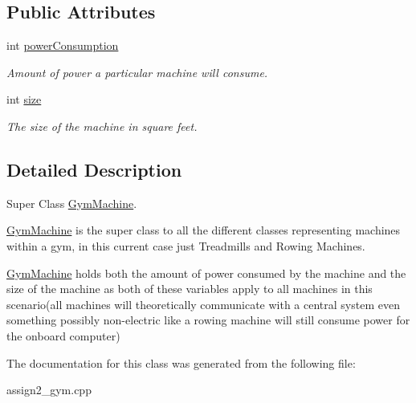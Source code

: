 \subsection*{Public Attributes}
\begin{DoxyCompactItemize}
\item 
\hypertarget{class_gym_machine_a680693dad7672fe9917de8951f59d182}{}int \hyperlink{class_gym_machine_a680693dad7672fe9917de8951f59d182}{power\+Consumption}\label{class_gym_machine_a680693dad7672fe9917de8951f59d182}

\begin{DoxyCompactList}\small\item\em Amount of power a particular machine will consume. \end{DoxyCompactList}\item 
\hypertarget{class_gym_machine_aa9dca285aa8e1fc53eb252cb691d3a69}{}int \hyperlink{class_gym_machine_aa9dca285aa8e1fc53eb252cb691d3a69}{size}\label{class_gym_machine_aa9dca285aa8e1fc53eb252cb691d3a69}

\begin{DoxyCompactList}\small\item\em The size of the machine in square feet. \end{DoxyCompactList}\end{DoxyCompactItemize}


\subsection{Detailed Description}
Super Class \hyperlink{class_gym_machine}{Gym\+Machine}. 

\hyperlink{class_gym_machine}{Gym\+Machine} is the super class to all the different classes representing machines within a gym, in this current case just Treadmills and Rowing Machines.

\hyperlink{class_gym_machine}{Gym\+Machine} holds both the amount of power consumed by the machine and the size of the machine as both of these variables apply to all machines in this scenario(all machines will theoretically communicate with a central system even something possibly non-\/electric like a rowing machine will still consume power for the onboard computer) 

The documentation for this class was generated from the following file\+:\begin{DoxyCompactItemize}
\item 
assign2\+\_\+gym.\+cpp\end{DoxyCompactItemize}
